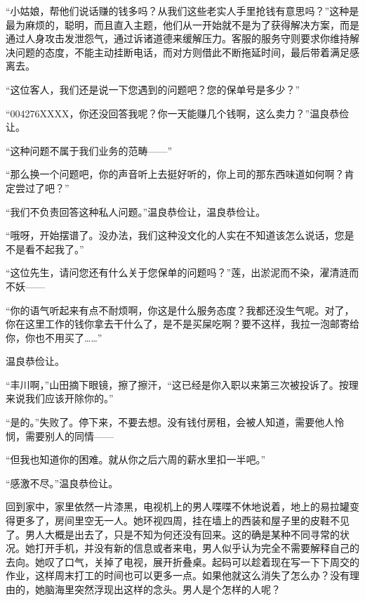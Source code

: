 \documentclass{article}
\begin{document}
“小姑娘，帮他们说话赚的钱多吗？从我们这些老实人手里抢钱有意思吗？”这种是最为麻烦的，聪明，而且直入主题，他们从一开始就不是为了获得解决方案，而是通过人身攻击发泄怨气，通过诉诸道德来缓解压力。客服的服务守则要求你维持解决问题的态度，不能主动挂断电话，而对方则借此不断拖延时间，最后带着满足感离去。



“这位客人，我们还是说一下您遇到的问题吧？您的保单号是多少？”



“004276XXXX，你还没回答我呢？你一天能赚几个钱啊，这么卖力？”温良恭俭让。



“这种问题不属于我们业务的范畴——”



“那么换一个问题吧，你的声音听上去挺好听的，你上司的那东西味道如何啊？肯定尝过了吧？”



“我们不负责回答这种私人问题。”温良恭俭让，温良恭俭让。



“哦呀，开始摆谱了。没办法，我们这种没文化的人实在不知道该怎么说话，您是不是看不起我了。”



“这位先生，请问您还有什么关于您保单的问题吗？”莲，出淤泥而不染，濯清涟而不妖——



“你的语气听起来有点不耐烦啊，你这是什么服务态度？我都还没生气呢。对了，你在这里工作的钱你拿去干什么了，是不是买屎吃啊？要不这样，我拉一泡邮寄给你，你也不用买了……”



温良恭俭让。



\newpage



“丰川啊，”山田摘下眼镜，擦了擦汗，“这已经是你入职以来第三次被投诉了。按理来说我们应该开除你的。”



“是的。”失败了。停下来，不要去想。没有钱付房租，会被人知道，需要他人怜悯，需要别人的同情——



“但我也知道你的困难。就从你之后六周的薪水里扣一半吧。”



“感激不尽。”温良恭俭让。



\newpage



回到家中，家里依然一片漆黑，电视机上的男人喋喋不休地说着，地上的易拉罐变得更多了，房间里空无一人。她环视四周，挂在墙上的西装和屋子里的皮鞋不见了。男人大概是出去了，只是不知为何还没有回来。这的确是某种不同寻常的状况。她打开手机，并没有新的信息或者来电，男人似乎认为完全不需要解释自己的去向。她叹了口气，关掉了电视，展开折叠桌。起码可以趁着现在写一下下周交的作业，这样周末打工的时间也可以更多一点。如果他就这么消失了怎么办？没有理由的，她脑海里突然浮现出这样的念头。男人是个怎样的人呢？
\end{document}
